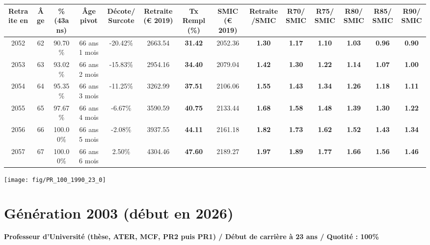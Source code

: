 \begin{adjustbox}{max width=\textwidth} 
\begin{tabular}[htb]{|c|c||c|c|c||c|c||c|c||c|c|c|c|c|} 
\hline 
 Retraite en &  Âge &  \%(43ans) &  Âge pivot &  Décote/Surcote &  Retraite (\euro{} 2019) &  Tx Rempl(\%) &  SMIC (\euro{} 2019) &  Retraite/SMIC &  R70/SMIC &  R75/SMIC &  R80/SMIC &  R85/SMIC &  R90/SMIC \\ 
\hline \hline 
 2052 &  62 &  90.70\% &  66 ans 1 mois &  -20.42\% &  2663.54 &  {\bf 31.42} &  2052.36 &  {\bf 1.30} &  {\bf 1.17} &  {\bf 1.10} &  {\bf 1.03} &  {\bf {\color{red} 0.96}} &  {\bf {\color{red} 0.90}} \\ 
\hline 
 2053 &  63 &  93.02\% &  66 ans 2 mois &  -15.83\% &  2954.16 &  {\bf 34.40} &  2079.04 &  {\bf 1.42} &  {\bf 1.30} &  {\bf 1.22} &  {\bf 1.14} &  {\bf 1.07} &  {\bf 1.00} \\ 
\hline 
 2054 &  64 &  95.35\% &  66 ans 3 mois &  -11.25\% &  3262.99 &  {\bf 37.51} &  2106.06 &  {\bf 1.55} &  {\bf 1.43} &  {\bf 1.34} &  {\bf 1.26} &  {\bf 1.18} &  {\bf 1.11} \\ 
\hline 
 2055 &  65 &  97.67\% &  66 ans 4 mois &  -6.67\% &  3590.59 &  {\bf 40.75} &  2133.44 &  {\bf 1.68} &  {\bf 1.58} &  {\bf 1.48} &  {\bf 1.39} &  {\bf 1.30} &  {\bf 1.22} \\ 
\hline 
 2056 &  66 &  100.00\% &  66 ans 5 mois &  -2.08\% &  3937.55 &  {\bf 44.11} &  2161.18 &  {\bf 1.82} &  {\bf 1.73} &  {\bf 1.62} &  {\bf 1.52} &  {\bf 1.43} &  {\bf 1.34} \\ 
\hline 
 2057 &  67 &  100.00\% &  66 ans 6 mois &  2.50\% &  4304.46 &  {\bf 47.60} &  2189.27 &  {\bf 1.97} &  {\bf 1.89} &  {\bf 1.77} &  {\bf 1.66} &  {\bf 1.56} &  {\bf 1.46} \\ 
\hline 
\hline 
\end{tabular} 
\end{adjustbox} 
 
 \vspace{0.1cm} 

 {\hspace{-2.2cm}\texttt{[image: fig/PR\_100\_1990\_23\_0]}} 

\newpage 
 
\section{Génération 2003 (début en 2026)\label{PR_100_2003_23_0}} 
 
{\bf \noindent Professeur d'Université (thèse, ATER, MCF, PR2 puis PR1) / Début de carrière à 23 ans / Quotité : 100\%}  ~ 

